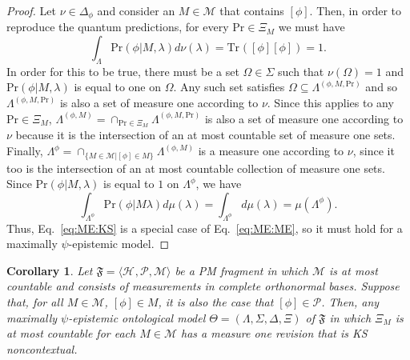 \documentclass[DIV=calc,paper=a4,fontsize=11pt,twocolumn]{scrartcl} %
\theoremstyle{definition}
\theoremstyle{plain}
\newtheorem{corollary}[definition]{Corollary}
\newcommand{\Proj}[1]{\ensuremath{\left [ #1 \right ]}}
\newcommand{\Hilb}[1][]{\ensuremath{\mathcal{H}_{#1}}}
\newcommand{\Tr}[2][]{\ensuremath{\text{Tr}_{#1} \left ( #2 \right )}}
\begin{document}
\begin{proof}
Let $\nu \in \Delta_{\phi}$ and consider an $M \in \mathcal{M}$ that
contains $\Proj{\phi}$.  Then, in order to reproduce the quantum
predictions, for every $\text{Pr} \in \Xi_M$ we must have
\begin{equation}
\int_{\Lambda} \text{Pr}(\phi|M,\lambda) d\nu(\lambda) =
\Tr{\Proj{\phi}\Proj{\phi}} = 1.
\end{equation}
In order for this to be true, there must be a set $\Omega \in
\Sigma$ such that $\nu(\Omega) = 1$ and $\text{Pr}(\phi|M,\lambda)$
is equal to one on $\Omega$.  Any such set satisfies $\Omega
\subseteq \Lambda^{(\phi,M,\text{Pr})}$ and so
$\Lambda^{(\phi,M,\text{Pr})}$ is also a set of measure one
according to $\nu$.  Since this applies to any $\text{Pr} \in
\Xi_M$, $\Lambda^{(\phi,M)} = \cap_{\text{Pr} \in \Xi_M}
\Lambda^{(\phi,M,\text{Pr})}$ is also a set of measure one according
to $\nu$ because it is the intersection of an at most countable set
of measure one sets.  Finally, $\Lambda^{\phi} = \cap_{\{M \in
\mathcal{M}| \Proj{\phi} \in M\}} \Lambda^{(\phi,M)}$ is a measure
one according to $\nu$, since it too is the intersection of an at
most countable collection of measure one sets. Since
$\text{Pr}(\phi|M,\lambda)$ is equal to $1$ on $\Lambda^{\phi}$, we
have
\begin{equation}
\int_{\Lambda^{\phi}} \text{Pr}(\phi|M \lambda) d\mu(\lambda) =
\int_{\Lambda^{\phi}} d\mu(\lambda) = \mu(\Lambda^{\phi}).
\end{equation}
Thus, Eq.~\eqref{eq:ME:KS} is a special case of
Eq.~\eqref{eq:ME:ME}, so it must hold for a maximally
$\psi$-epistemic model.
\end{proof}

\begin{corollary}
\label{cor:ME:KS}
Let $\mathfrak{F} = \langle \Hilb, \mathcal{P}, \mathcal{M} \rangle$
be a PM fragment in which $\mathcal{M}$ is at most countable and
consists of measurements in complete orthonormal bases.  Suppose
that, for all $M \in \mathcal{M}$, $\Proj{\phi} \in M$, it is also
the case that $\Proj{\phi} \in \mathcal{P}$.  Then, any maximally
$\psi$-epistemic ontological model $\Theta =
(\Lambda,\Sigma,\Delta,\Xi)$ of $\mathfrak{F}$ in which $\Xi_M$ is
at most countable for each $M \in \mathcal{M}$ has a measure one
revision that is KS noncontextual.
\end{corollary}
\end{document}
